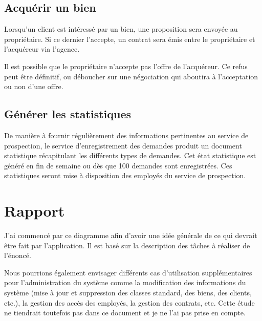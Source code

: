 \subsection{Acquérir un bien}

Lorsqu'un client est intéressé par un bien, une proposition sera envoyée au propriétaire. Si ce dernier l'accepte, un contrat sera émis entre le propriétaire et l'acquéreur via l'agence.

Il est possible que le propriétaire n'accepte pas l'offre de l'acquéreur. Ce refus peut être définitif, ou déboucher sur une négociation qui aboutira à l'acceptation ou non d'une offre.

\subsection{Générer les statistiques}

De manière à fournir régulièrement des informations pertinentes au service de prospection, le service d'enregistrement des demandes produit un document statistique récapitulant les différents types de demandes. Cet état statistique est généré en fin de semaine ou dès que 100 demandes sont enregistrées. Ces statistiques seront mise à disposition des employés du service de prospection.

\section{Rapport}

J'ai commencé par ce diagramme afin d'avoir une idée générale de ce qui devrait être fait par l'application. Il est basé sur la description des tâches à réaliser de l'énoncé.

Nous pourrions également envisager différents cas d'utilisation supplémentaires pour l'administration du système comme la modification des informations du système (mise à jour et suppression des classes standard, des biens, des clients, etc.), la gestion des accès des employés, la gestion des contrats, etc. Cette étude ne tiendrait toutefois pas dans ce document et je ne l'ai pas prise en compte.